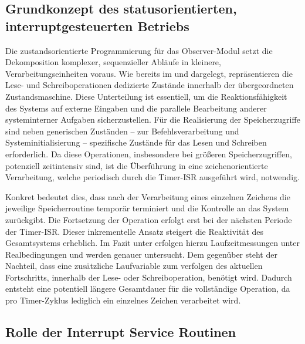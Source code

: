\subsection{Grundkonzept des statusorientierten, interruptgesteuerten Betriebs}
\label{sec:konzept_status_&_interrupt}

Die zustandsorientierte Programmierung f\"ur das Observer-Modul setzt die Dekomposition komplexer, sequenzieller Abl\"aufe in kleinere, Verarbeitungseinheiten voraus. Wie bereits im  und  dargelegt, repr\"asentieren die Lese- und Schreiboperationen dedizierte Zust\"ande innerhalb der \"ubergeordneten Zustandsmaschine. Diese Unterteilung ist essentiell, um die Reaktionsf\"ahigkeit des Systems auf externe Eingaben und die \glqq{}parallele\grqq{} Bearbeitung anderer systeminterner Aufgaben sicherzustellen. F\"ur die Realisierung der Speicherzugriffe sind neben generischen Zust\"anden -- zur Befehlsverarbeitung und Systeminitialisierung -- spezifische Zust\"ande f\"ur das Lesen und Schreiben erforderlich. Da diese Operationen, insbesondere bei gr\"o{\ss}eren Speicherzugriffen, potenziell zeitintensiv sind, ist die \"Uberf\"uhrung in eine zeichenorientierte Verarbeitung, welche periodisch durch die Timer-ISR ausgef\"uhrt wird, notwendig.

\newpage
Konkret bedeutet dies, dass nach der Verarbeitung eines einzelnen Zeichens die jeweilige Speicherroutine tempor\"ar terminiert und die Kontrolle an das System zur\"uckgibt. Die Fortsetzung der Operation erfolgt erst bei der n\"achsten Periode der Timer-ISR. Dieser inkrementelle Ansatz steigert die Reaktivit\"at des Gesamtsystems erheblich. Im Fazit unter  erfolgen hierzu Laufzeitmessungen unter Realbedingungen und werden genauer untersucht. Dem gegen\"uber steht der Nachteil, dass eine zus\"atzliche Laufvariable zum verfolgen des aktuellen Fortschritts, innerhalb der Lese- oder Schreiboperation, ben\"otigt wird. Dadurch entsteht eine potentiell l\"angere Gesamtdauer f\"ur die vollst\"andige Operation, da pro Timer-Zyklus lediglich ein einzelnes Zeichen verarbeitet wird.\AI


\subsection{Rolle der Interrupt Service Routinen}
\label{sec:LesenSchreiben_Rolle_ISR}

